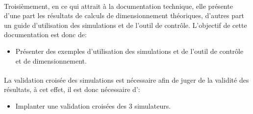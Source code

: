 \paragraph{}Troisièmement, en ce qui attrait à la documentation technique, elle présente d'une part les résultats de calculs de dimensionnement théoriques, d'autres part un guide d'utilisation des simulations et de l'outil de contrôle. L'objectif de cette documentation est donc de:
\begin{itemize}
\item Présenter des exemples d'utilisation des simulations et de l'outil de contrôle et de dimensionnement.
\end{itemize}
\paragraph{}La validation croisée des simulations est nécessaire afin de juger de la validité des résultats, à cet effet, il est donc nécessaire d':
\begin{itemize}
\item Implanter une validation croisées des 3 simulateurs.
\end{itemize}